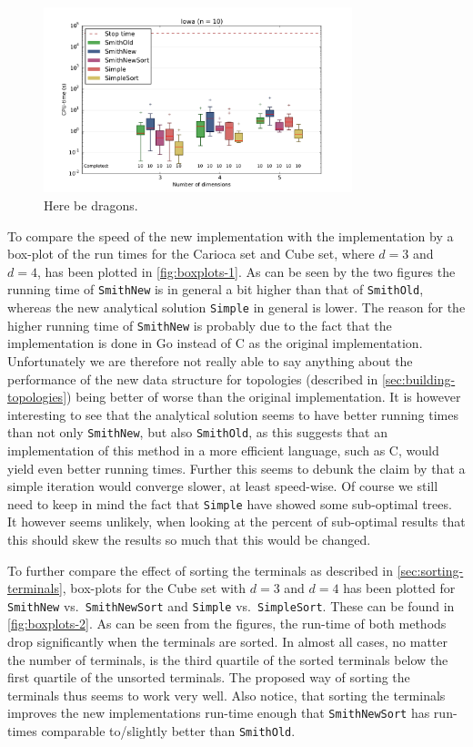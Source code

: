 \begin{figure}[htbp]
  \centering
  \includegraphics[width=0.8\textwidth]{gfx/boxplots/plot_nvst_boxplot_n10_Iowa_1}
  \caption[Box-plot for Iowa with $n = 10$]{Here be dragons.\label{fig:boxplot-iowa-n10}}
\end{figure}

To compare the speed of the new implementation with the implementation by
\textcite{smith1992} a box-plot of the run times for the Carioca set and Cube
set, where $d = 3$ and $d = 4$, has been plotted in \cref{fig:boxplots-1}. As
can be seen by the two figures the running time of \texttt{SmithNew} is in
general a bit higher than that of \texttt{SmithOld}, whereas the new analytical
solution \texttt{Simple} in general is lower. The reason for the higher running
time of \texttt{SmithNew} is probably due to the fact that the implementation is
done in Go instead of C as the original implementation. Unfortunately we are
therefore not really able to say anything about the performance of the new data
structure for topologies (described in \cref{sec:building-topologies}) being
better of worse than the original implementation. It is however interesting to
see that the analytical solution seems to have better running times than not
only \texttt{SmithNew}, but also \texttt{SmithOld}, as this suggests that an
implementation of this method in a more efficient language, such as C, would
yield even better running times. Further this seems to debunk the claim by
\textcite{smith1992} that a simple iteration would converge slower, at least
speed-wise. Of course we still need to keep in mind the fact that
\texttt{Simple} have showed some sub-optimal trees. It however seems unlikely,
when looking at the percent of sub-optimal results that this should skew the
results so much that this would be changed.

To further compare the effect of sorting the terminals as described
in \cref{sec:sorting-terminals}, box-plots for the Cube set with $d = 3$ and $d
= 4$ has been plotted for \texttt{SmithNew} vs.\ \texttt{SmithNewSort} and
\texttt{Simple} vs.\ \texttt{SimpleSort}. These can be found
in \cref{fig:boxplots-2}. As can be seen from the figures, the run-time of both
methods drop significantly when the terminals are sorted. In almost all cases,
no matter the number of terminals, is the third quartile of the sorted terminals
below the first quartile of the unsorted terminals. The proposed way of sorting
the terminals thus seems to work very well. Also notice, that sorting the
terminals improves the new implementations run-time enough that
\texttt{SmithNewSort} has run-times comparable to/slightly better than
\texttt{SmithOld}.

